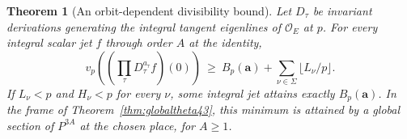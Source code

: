 \documentclass[a4paper,11pt]{article}
\newtheorem{theorem}[proposition]{Theorem}
\theoremstyle{definition}
\theoremstyle{remark}
\numberwithin{equation}{section}
\newcommand{\OO}{\mathcal O}
\begin{document}
\begin{theorem}[An orbit-dependent divisibility bound]\label{thm:gain52}
Let \(D_\tau\) be invariant derivations generating the integral
tangent eigenlines of \(\OO_E\) at \(p\).
For every integral scalar jet \(f\) through order \(A\) at the identity,
\begin{equation}
   v_p\!\left(\left(\prod_\tau D_\tau^{a_\tau} f\right)(0)\right)
        \ \ge\ B_p(\boldsymbol a)+\sum_{\nu\in\Sigma}\lfloor L_\nu/p\rfloor .
                                                              \label{eq:gain52}
\end{equation}
If \(L_\nu<p\) and \(H_\nu<p\) for every \(\nu\), some integral
jet attains exactly \(B_p(\boldsymbol a)\). In the frame of
Theorem~\ref{thm:globaltheta43}, this minimum is attained by a global
section of \(P^{3A}\) at the chosen place, for \(A\ge1\).
\end{theorem}
\end{document}
